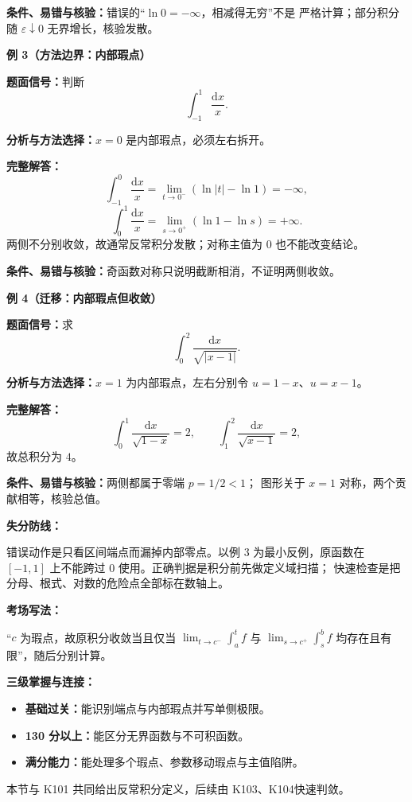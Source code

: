 \begin{knowledgeBox}
\textbf{条件、易错与核验：}错误的“\(\ln0=-\infty\)，相减得无穷”不是
严格计算；部分积分随 \(\varepsilon\downarrow0\) 无界增长，核验发散。

\textbf{例 3（方法边界：内部瑕点）}

\textbf{题面信号：}判断
\[
\int_{-1}^{1}\frac{\mathrm dx}{x}.
\]

\textbf{分析与方法选择：}\(x=0\) 是内部瑕点，必须左右拆开。

\textbf{完整解答：}
\[
\int_{-1}^{0}\frac{\mathrm dx}{x}
=\lim_{t\to0^-}(\ln|t|-\ln1)=-\infty,
\]
\[
\int_{0}^{1}\frac{\mathrm dx}{x}
=\lim_{s\to0^+}(\ln1-\ln s)=+\infty.
\]
两侧不分别收敛，故通常反常积分发散；对称主值为 \(0\) 也不能改变结论。

\textbf{条件、易错与核验：}奇函数对称只说明截断相消，不证明两侧收敛。

\textbf{例 4（迁移：内部瑕点但收敛）}

\textbf{题面信号：}求
\[
\int_0^2\frac{\mathrm dx}{\sqrt{|x-1|}}.
\]

\textbf{分析与方法选择：}\(x=1\) 为内部瑕点，左右分别令
\(u=1-x\)、\(u=x-1\)。

\textbf{完整解答：}
\[
\int_0^1\frac{\mathrm dx}{\sqrt{1-x}}=2,\qquad
\int_1^2\frac{\mathrm dx}{\sqrt{x-1}}=2,
\]
故总积分为 \(4\)。

\textbf{条件、易错与核验：}两侧都属于零端 \(p=1/2<1\)；
图形关于 \(x=1\) 对称，两个贡献相等，核验总值。

\textbf{失分防线：}

错误动作是只看区间端点而漏掉内部零点。以例 3 为最小反例，原函数在
\([-1,1]\) 上不能跨过 \(0\) 使用。正确判据是积分前先做定义域扫描；
快速检查是把分母、根式、对数的危险点全部标在数轴上。

\textbf{考场写法：}

“\(c\) 为瑕点，故原积分收敛当且仅当
\(\lim_{t\to c^-}\int_a^t f\) 与
\(\lim_{s\to c^+}\int_s^bf\) 均存在且有限”，随后分别计算。

\textbf{三级掌握与连接：}
\begin{itemize}
  \item \textbf{基础过关：}能识别端点与内部瑕点并写单侧极限。
  \item \textbf{130 分以上：}能区分无界函数与不可积函数。
  \item \textbf{满分能力：}能处理多个瑕点、参数移动瑕点与主值陷阱。
\end{itemize}
本节与 K101 共同给出反常积分定义，后续由 K103、K104快速判敛。
\end{knowledgeBox}


